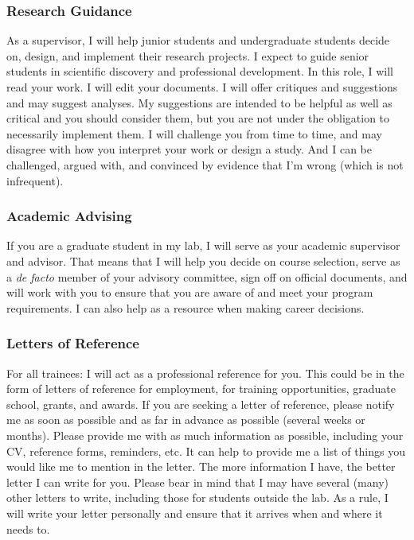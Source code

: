 \documentclass{article}
\begin{document}
\subsubsection{Research Guidance} As a supervisor, I will help junior students and undergraduate students decide on, design, and implement their research projects. I expect to guide senior students in scientific discovery and professional development. In this role, I will read your work. I will edit your documents. I will offer critiques and suggestions and may suggest analyses. My suggestions are intended to be helpful as well as critical and you should consider them, but you are not under the obligation to necessarily implement them.  I will challenge you from time to time, and may disagree with how you interpret your work or design a study. And I can be challenged, argued with, and convinced by evidence that I'm wrong (which is not infrequent).

\subsubsection{Academic Advising} If you are a graduate student in my lab, I will serve as your academic supervisor and advisor. That means that I will help you decide on course selection, serve as a \textit{de facto} member of your advisory committee, sign off on official documents, and will work with you to ensure that you are aware of and meet your program requirements. I can also help as a resource when making career decisions. 

\subsubsection {Letters of Reference} For all trainees: I will act as a professional reference for you. This could be in the form of letters of reference for employment, for training opportunities, graduate school, grants, and awards. If you are seeking a letter of reference, please notify me as soon as possible and as far in advance as possible (several weeks or months). Please provide me with as much information as possible, including your CV, reference forms, reminders, etc. It can help to provide me a list of things you would like me to mention in the letter. The more information I have, the better letter I can write for you. Please bear in mind that I may have several (many) other letters to write, including those for students outside the lab. As a rule, I will write your letter personally and ensure that it arrives when and where it needs to.
\end{document}
